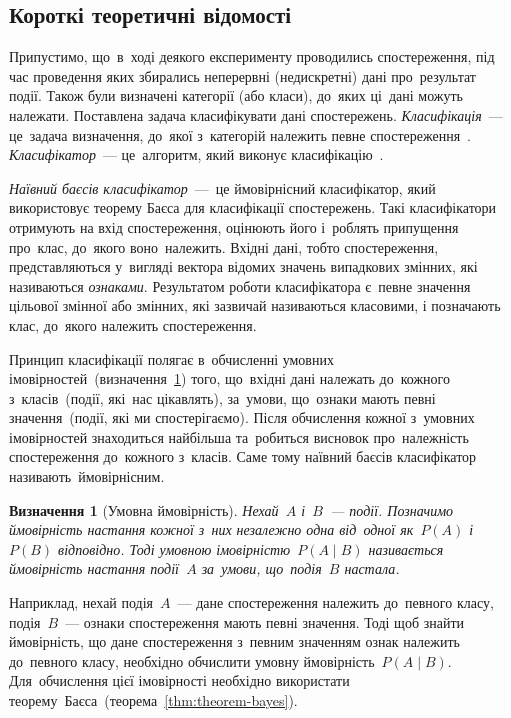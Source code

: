 \documentclass[
	a4paper,
	oneside,
	DIV = 12,
	fontsize = 13pt,
	headings = normal,
	numbers = endperiod,
]{scrartcl}
\theoremstyle{mythm}
\newtheorem{mydef}{Визначення}
\begin{document}
		\subsection{Короткі теоретичні відомості}
			Припустимо, що~в~ході деякого експерименту проводились спостереження, під час проведення яких збирались неперервні (недискретні) дані про~результат події. Також були визначені категорії (або класи), до~яких ці~дані можуть належати. Поставлена задача класифікувати дані спостережень. \emph{Класифікація}~— це~задача визначення, до~якої з~категорій належить певне спостереження~\cite{wiki-stat-classification}. \emph{Класифікатор}~— це~алгоритм, який виконує класифікацію~\cite{wiki-stat-classification}.

			\emph{Наївний баєсів класифікатор}~— це ймовірнісний класифікатор, який використовує теорему Баєса для класифікації спостережень. Такі класифікатори отримують на вхід спостереження, оцінюють його і~роблять припущення про~клас, до~якого воно~належить. Вхідні дані, тобто спостереження, представляються у~вигляді вектора відомих значень випадкових змінних, які називаються \emph{ознаками}. Результатом роботи класифікатора є~певне значення цільової змінної або змінних, які зазвичай називаються класовими, і позначають клас, до~якого належить спостереження.

			Принцип класифікації полягає в~обчисленні умовних імовірностей~(визначення~\ref{def:conditional-probability}) того, що~вхідні дані належать до~кожного з~класів~(події, які~нас цікавлять), за~умови, що~ознаки мають певні значення~(події, які ми спостерігаємо). Після обчислення кожної з~умовних імовірностей знаходиться найбільша та~робиться висновок про~належність спостереження до~кожного з~класів. Саме тому наївний баєсів класифікатор називають~ймовірнісним.

			\begin{mydef}[Умовна ймовірність]
				\label{def:conditional-probability}
				Нехай~$A$ і~$B$~— події. Позначимо ймовірність настання кожної з~них незалежно одна від~одної як~$P(A)$ і~$P(B)$ відповідно. Тоді \emph{умовною імовірністю}~$P(A \mid B)$ називається ймовірність настання події~$A$ за~умови, що~подія~$B$ настала.
			\end{mydef}
			
			Наприклад, нехай подія~$A$~— дане спостереження належить до~певного класу, подія~$B$~— ознаки спостереження мають певні значення. Тоді щоб знайти ймовірність, що дане спостереження з~певним значенням ознак належить до~певного класу, необхідно обчислити умовну ймовірність~$P(A \mid B)$. Для~обчислення цієї імовірності необхідно використати теорему~Баєса~(теорема~\ref{thm:theorem-bayes}).
\end{document}
